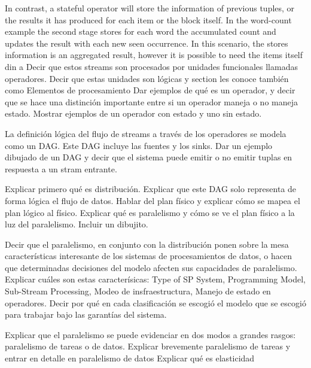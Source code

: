   In contrast, a stateful operator will store the information of previous
  tuples, or the results it has produced for each item or the block itself. In
  the word-count example the second stage stores for each word the accumulated
  count and updates the result with each new seen occurrence. In this scenario,
  the stores information is an aggregated result, however it is possible to
  need the items itself din a Decir que estos streams son procesados por
  unidades funcionales llamadas operadores. Decir que estas unidades son
  lógicas y section les conoce también como Elementos de procesamiento
  \cite{kamburugamuve2013survey} Dar ejemplos de qué es un operador, y decir
  que se hace una distinción importante entre si un operador maneja o no maneja
  estado. Mostrar ejemplos de un operador con estado y uno sin estado.
  \cite{KottoKombi2015ParallelAD}

  La definición lógica del flujo de streams a través de los operadores se
  modela como un DAG. Este DAG incluye las fuentes y los sinks. Dar un ejemplo
  dibujado de un DAG y decir que el sistema puede emitir o no emitir tuplas en
  respuesta a un stram entrante.

  Explicar primero qué es distribución. Explicar que este DAG solo representa
  de forma lógica el flujo de datos. Hablar del plan físico y explicar cómo se
  mapea el plan lógico al físico. Explicar qué es paralelismo y cómo se ve el
  plan físico a la luz del paralelismo. Incluir un dibujito.
  \cite{kamburugamuve2013survey}

  Decir que el paralelismo, en conjunto con la distribución ponen sobre la mesa
  características interesante de los sistemas de procesamientos de datos, o
  hacen que determinadas decisiones del modelo afecten sus capacidades de
  paralelismo. Explicar cuáles son estas caracterísicas: Type of SP System,
  Programming Model, Sub-Stream Processing, Modeo de insfraestructura, Manejo
  de estado en operadores. \cite{R_ger_2019} Decir por qué en cada
  clasificación se escogió el modelo que se escogió para trabajar bajo las
  garantías del sistema.

  Explicar que el paralelismo se puede evidenciar en dos modos a grandes
  rasgos: paralelismo de tareas o de datos. Explicar brevemente paralelismo de
  tareas y entrar en detalle en paralelismo de datos
  Explicar qué es elasticidad

